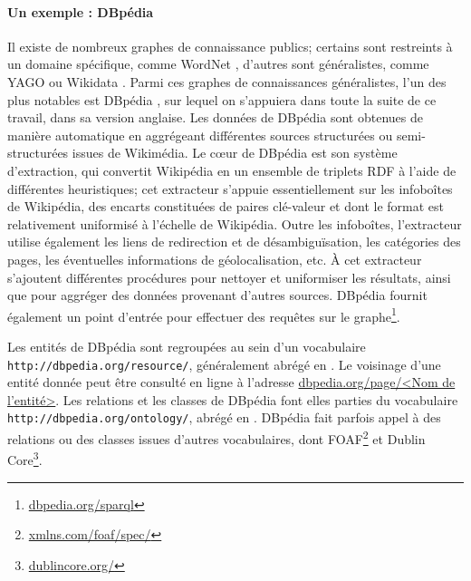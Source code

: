 

\paragraph{Un exemple : DBpédia}

Il existe de nombreux graphes de connaissance publics; certains sont restreints à un domaine spécifique, comme WordNet \cite{miller1998wordnet}, d'autres sont généralistes, comme YAGO \cite{suchanek2008yago} ou Wikidata \cite{vrandevcic2014wikidata}. Parmi ces graphes de connaissances généralistes, l'un des plus notables est DBpédia \cite{auer2007dbpedia}, sur lequel on s'appuiera dans toute la suite de ce travail, dans sa version anglaise. Les données de DBpédia sont obtenues de manière automatique en aggrégeant différentes sources structurées ou semi-structurées issues de Wikimédia. Le cœur de DBpédia est son système d'extraction, qui convertit Wikipédia en un ensemble de triplets RDF à l'aide de différentes heuristiques; cet extracteur s'appuie essentiellement sur les infoboîtes de Wikipédia, des encarts constituées de paires clé-valeur et dont le format est relativement uniformisé à l'échelle de Wikipédia. Outre les infoboîtes, l'extracteur utilise également les liens de redirection et de désambiguïsation, les catégories des pages, les éventuelles informations de géolocalisation, etc. À cet extracteur s'ajoutent différentes procédures pour nettoyer et uniformiser les résultats, ainsi que pour aggréger des données provenant d'autres sources. DBpédia fournit également un point d'entrée pour effectuer des requêtes sur le graphe\footnote{\href{https://dbpedia.org/sparql}{dbpedia.org/sparql}}.

Les entités de DBpédia sont regroupées au sein d'un vocabulaire \texttt{http://dbpedia.org/resource/}, généralement abrégé en \dbr{}. Le voisinage d'une entité donnée  %
peut être consulté en ligne à l'adresse \href{http://dbpedia.org/page/<Nom de l'entité>}{dbpedia.org/page/<Nom de l'entité>}. Les relations et les classes de DBpédia font elles parties du vocabulaire \texttt{http://dbpedia.org/ontology/}, abrégé en \dbo{}. DBpédia fait parfois appel à des relations ou des classes issues d'autres vocabulaires, dont FOAF\footnote{\href{http://xmlns.com/foaf/spec/}{xmlns.com/foaf/spec/}} et Dublin Core\footnote{\href{https://dublincore.org/}{dublincore.org/}}.


